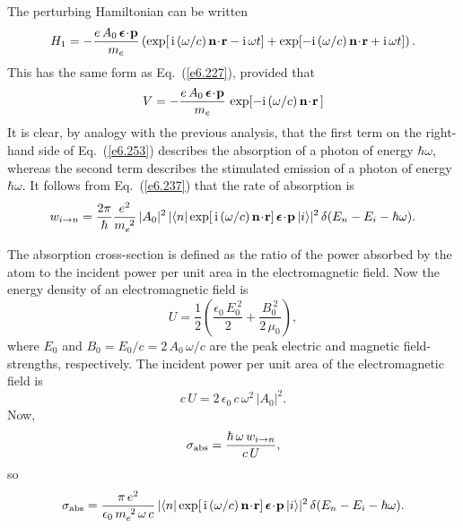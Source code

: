 The perturbing Hamiltonian can be written
\begin{equation}\label{e6.253}
H_1 = - \frac{e \,A_0\, \mbox{\boldmath$\epsilon$} \!\cdot\!{\bf p} }{m_e}
\left(\exp[\,{\rm i}\,(\omega/c)\, {\bf n}\!\cdot\!{\bf r} - {\rm i}\,
\omega t] +  \exp[-{\rm i}\,(\omega/c)\, {\bf n}\!\cdot\!{\bf r} + {\rm i}\,
\omega t]\right).
\end{equation}
This has the same form as Eq.~(\ref{e6.227}), provided that
\begin{equation}
V = - \frac{e \,A_0\, \mbox{\boldmath$\epsilon$} \!\cdot\!{\bf p} }{m_e}\, \exp[-{\rm i}\,(\omega/c)\, {\bf n}\!\cdot\!{\bf r}\,]
\end{equation}
It is clear, by analogy with the previous analysis, that the first
term on the right-hand side of Eq.~(\ref{e6.253}) describes the absorption
of a photon of energy $\hbar\omega$, whereas the second term describes
the stimulated emission of a photon of energy $\hbar\omega$. It follows from
Eq.~(\ref{e6.237}) that the rate of absorption is
\begin{equation}
w_{i\rightarrow n} = \frac{2\pi}{\hbar} \frac{e^2}{m_e^{~2}}\,
|A_0|^2\, |\langle n| \exp[\,{\rm i}\,(\omega/c)\,{\bf n}\!\cdot\!{\bf r}]\,
\mbox{\boldmath$\epsilon$}\!\cdot\!{\bf p} \,|i\rangle|^2\,
\delta(E_n-E_i -\hbar\omega).
\end{equation}

The absorption cross-section is defined as the ratio of the
power  absorbed  by the atom to the incident power
per unit area in the electromagnetic field. Now the energy density of an electromagnetic field
is
\begin{equation}
U = \frac{1}{2}\left(\frac{\epsilon_0\,E_0^{~2}}{2}+ \frac{B_0^{~2}}{2\,\mu_0}
\right),
\end{equation}
where $E_0$ and $B_0=E_0/c= 2\,A_0\,\omega/c$ are the peak electric and magnetic field-strengths,
respectively. The incident power per unit area of the electromagnetic field
is 
\begin{equation} 
c\,U = 2\,\epsilon_0\, c\, \omega^2\, |A_0|^2.
\end{equation}
Now,
\begin{equation}
\sigma_{\rm abs} = \frac{\hbar\,\omega \, w_{i\rightarrow n}}{c \,U},
\end{equation}
so
\begin{equation}\label{e6.259}
\sigma_{\rm abs} = \frac{\pi \,e^2}{\epsilon_0\,m_e^{~2}\, \omega\, c} \,
|\langle n| \exp[\,{\rm i}\,(\omega/c)\,{\bf n}\!\cdot\!{\bf r}]\,
\mbox{\boldmath$\epsilon$}\!\cdot\!{\bf p}\, |i\rangle|^2\,
\delta(E_n-E_i -\hbar\omega).
\end{equation}

